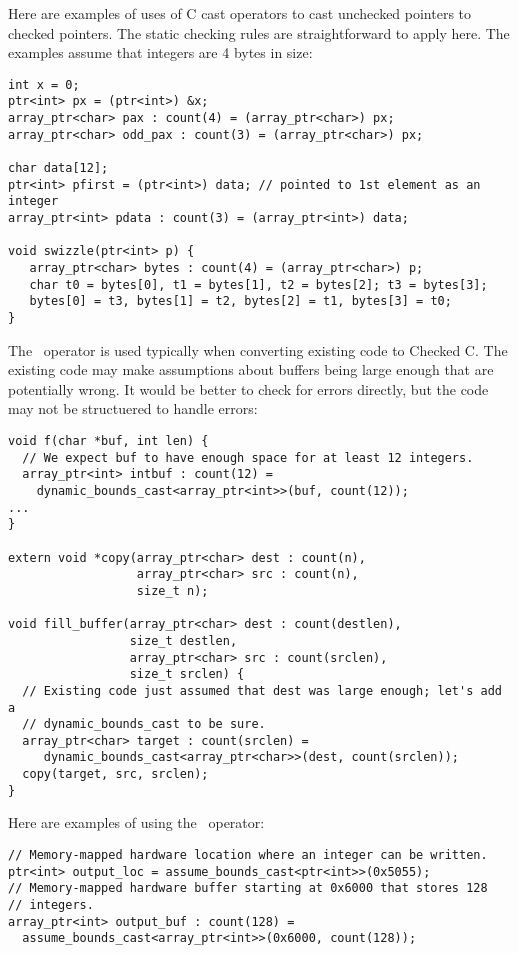 Here are examples of uses of C cast operators to cast unchecked
pointers to checked pointers.  The static checking rules are straightforward
to apply here.  The examples assume that integers are
4 bytes in size:
\begin{lstlisting}
int x = 0;
ptr<int> px = (ptr<int>) &x;
array_ptr<char> pax : count(4) = (array_ptr<char>) px;
array_ptr<char> odd_pax : count(3) = (array_ptr<char>) px;

char data[12];
ptr<int> pfirst = (ptr<int>) data; // pointed to 1st element as an integer
array_ptr<int> pdata : count(3) = (array_ptr<int>) data;

void swizzle(ptr<int> p) {
   array_ptr<char> bytes : count(4) = (array_ptr<char>) p;
   char t0 = bytes[0], t1 = bytes[1], t2 = bytes[2]; t3 = bytes[3];
   bytes[0] = t3, bytes[1] = t2, bytes[2] = t1, bytes[3] = t0;
}
\end{lstlisting}
The \dynamicboundscast\ operator is used typically when converting
existing code to Checked C.  The existing code may make assumptions
about buffers being large enough that are potentially wrong.
It would be better to check for errors directly, but the code may not
be structuered to handle errors:
\begin{lstlisting}
void f(char *buf, int len) {
  // We expect buf to have enough space for at least 12 integers.
  array_ptr<int> intbuf : count(12) =
    dynamic_bounds_cast<array_ptr<int>>(buf, count(12));
...
}

extern void *copy(array_ptr<char> dest : count(n),
                  array_ptr<char> src : count(n),
                  size_t n);

void fill_buffer(array_ptr<char> dest : count(destlen),
                 size_t destlen,
                 array_ptr<char> src : count(srclen),
                 size_t srclen) {
  // Existing code just assumed that dest was large enough; let's add a
  // dynamic_bounds_cast to be sure.
  array_ptr<char> target : count(srclen) =
     dynamic_bounds_cast<array_ptr<char>>(dest, count(srclen));
  copy(target, src, srclen);
}
\end{lstlisting}
Here are examples of using the \assumeboundscast\ operator:
\begin{lstlisting}
// Memory-mapped hardware location where an integer can be written.
ptr<int> output_loc = assume_bounds_cast<ptr<int>>(0x5055);
// Memory-mapped hardware buffer starting at 0x6000 that stores 128
// integers.
array_ptr<int> output_buf : count(128) =
  assume_bounds_cast<array_ptr<int>>(0x6000, count(128));
\end{lstlisting}
